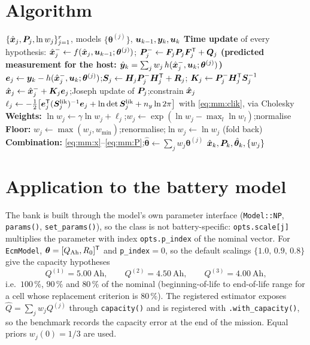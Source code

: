 \section{Algorithm}
\begin{algorithm}[H]
\caption{MMAE --- one sampling period}
\begin{algorithmic}[1]
\Require $\{\hat{\bm{x}}_j,\bm{P}_j,\ln w_j\}_{j=1}^{r}$, models $\{\bm\theta^{(j)}\}$, $\bm{u}_{k-1},\bm{y}_k,\bm{u}_k$
\State \textbf{Time update} of every hypothesis: $\hat{\bm{x}}^{-}_j\gets f(\hat{\bm{x}}_j,\bm{u}_{k-1};\bm\theta^{(j)})$;\quad
       $\bm{P}^{-}_j\gets\bm{F}_j\bm{P}_j\bm{F}_j^{\mathsf{T}}+\bm{Q}_j$
\State \textbf{(predicted measurement for the host: } $\hat{\bm{y}}_k=\sum_j w_j\,h(\hat{\bm{x}}^{-}_j,\bm{u}_k;\bm\theta^{(j)})$\textbf{)}
  \State $\bm{e}_j\gets\bm{y}_k-h(\hat{\bm{x}}^{-}_j,\bm{u}_k;\bm\theta^{(j)})$;\quad $\bm{S}_j\gets\bm{H}_j\bm{P}^{-}_j\bm{H}_j^{\mathsf{T}}+\bm{R}_j$;\quad
         $\bm{K}_j\gets\bm{P}^{-}_j\bm{H}_j^{\mathsf{T}}\bm{S}_j^{-1}$
  \State $\hat{\bm{x}}_j\gets\hat{\bm{x}}^{-}_j+\bm{K}_j\bm{e}_j$;\quad Joseph update of $\bm{P}_j$;\quad constrain $\hat{\bm{x}}_j$
  \State $\ell_j\gets-\tfrac12\big[\bm{e}_j^{\mathsf{T}}(\bm{S}_j^{\text{lik}})^{-1}\bm{e}_j+\ln\det\bm{S}_j^{\text{lik}}+n_y\ln2\pi\big]$ with \eqref{eq:mm:clik}, via Cholesky
\EndFor
\State \textbf{Weights:} $\ln w_j\gets\gamma\ln w_j+\ell_j$;\quad $w_j\gets\exp(\ln w_j-\max_l\ln w_l)$;\quad normalise
\State \textbf{Floor:} $w_j\gets\max(w_j,w_{\min})$;\quad renormalise;\quad $\ln w_j\gets\ln w_j$ (fold back)
\State \textbf{Combination:} \eqref{eq:mm:x}--\eqref{eq:mm:P};\quad $\hat{\bm\theta}\gets\sum_j w_j\bm\theta^{(j)}$
\Ensure $\hat{\bm{x}}_k,\bm{P}_k,\hat{\bm\theta}_k,\{w_j\}$
\end{algorithmic}
\end{algorithm}

\section{Application to the battery model}
The bank is built through the model's own parameter interface (\texttt{Model::NP},
\texttt{params()}, \texttt{set\_params()}), so the class is not battery-specific:
\texttt{opts.scale[j]} multiplies the parameter with index \texttt{opts.p\_index} of the nominal
vector.  For \texttt{EcmModel}, $\bm\theta=[Q_{\mathrm{Ah}},R_0]^{\mathsf{T}}$ and \texttt{p\_index}$=0$, so the
default scalings $\{1.0,\,0.9,\,0.8\}$ give the capacity hypotheses
\begin{equation}
Q^{(1)}=\SI{5.00}{\ampere\hour},\qquad Q^{(2)}=\SI{4.50}{\ampere\hour},\qquad Q^{(3)}=\SI{4.00}{\ampere\hour},
\end{equation}
i.e.\ $100\,\%$, $90\,\%$ and $80\,\%$ of the nominal (beginning-of-life to end-of-life range for a
cell whose replacement criterion is $80\,\%$).  The registered estimator exposes
$\hat Q = \sum_j w_j Q^{(j)}$ through \texttt{capacity()} and is registered with
\texttt{.with\_capacity()}, so the benchmark records the capacity error at the end of the mission.
Equal priors $w_j(0)=1/3$ are used.

